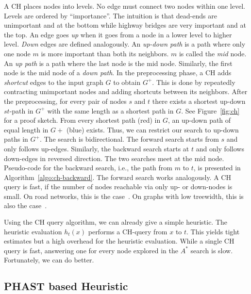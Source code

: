 \documentclass[a4paper,USenglish,cleveref, autoref, thm-restate]{lipics-v2019}
\begin{document}
A CH places nodes into levels.
No edge must connect two nodes within one level.
Levels are ordered by ``importance''.
The intuition is that dead-ends are unimportant and at the bottom while highway bridges are very important and at the top.
An edge goes \emph{up} when it goes from a node in a lower level to higher level.
\emph{Down} edges are defined analogously.
An \emph{up-down path} is a path where only one node $m$ is more important than both its neighbors.
$m$ is called the \emph{mid} node.
An \emph{up path} is a path where the last node is the mid node.
Similarly, the first node is the mid node of a \emph{down path}.
%
In the preprocessing phase, a CH adds \emph{shortcut} edges to the input graph $G$ to obtain $G^+$.
This is done by repeatedly contracting unimportant nodes and adding shortcuts between its neighbors.
After the preprocessing, for every pair of nodes $s$ and $t$ there exists a shortest up-down $st$-path in $G^+$ with the same length as a shortest path in $G$.
See Figure~\ref{fig:ch} for a proof sketch.
From every shortest path (red) in $G$, an up-down path of equal length in $G+$ (blue) exists.
Thus, we can restrict our search to up-down paths in $G^+$.
The search is bidirectional.
The forward search starts from $s$ and only follows up-edges.
Similarly, the backward search starts at $t$ and only follows down-edges in reversed direction.
The two searches meet at the mid node.
Pseudo-code for the backward search, i.e., the path from $m$ to $t$, is presented in Algorithm~\ref{algo:ch-backward}.
The forward search works analogously.
%
A CH query is fast, if the number of nodes reachable via only up- or down-nodes is small.
On road networks, this is the case~\cite{gssv-erlrn-12,dgrw-gpnc-11,dgpw-crprn-13}.
On graphs with low treewidth, this is also the case~\cite{dsw-cch-15,hs-gbpo-18}.

Using the CH query algorithm, we can already give a simple heuristic.
The heuristic evaluation $h_t(x)$ performs a CH-query from $x$ to $t$.
This yields tight estimates but a high overhead for the heuristic evaluation.
While a single CH query is fast, answering one for every node explored in the $A^*$ search is slow.
Fortunately, we can do better.

\subsection{PHAST based Heuristic}
\end{document}
